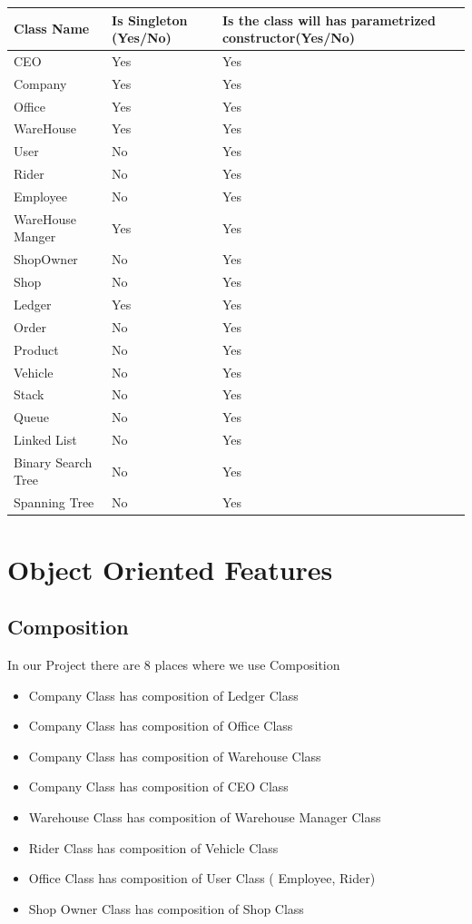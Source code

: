 \documentclass[12pt,a4paper]{report}
\begin{document}
\begin{center}
\begin{tabular}{ | m{4cm}|m{4cm}|m{4cm}|} 
 \hline

\textbf{ Class Name} &\textbf{ Is Singleton (Yes/No)} &\textbf {Is the class will has parametrized constructor(Yes/No)}\\ \hline
CEO 		&Yes	&Yes \\\hline
Company		&Yes	&Yes \\\hline
Office		&Yes	&Yes \\\hline
WareHouse	&Yes		&Yes \\\hline
User		&No		&Yes \\\hline
Rider		&No		&Yes \\\hline
Employee  	&No		&Yes \\\hline
WareHouse Manger  &Yes		&Yes\\ \hline
ShopOwner 	&No		&Yes\\ \hline
Shop	  	&No		&Yes \\ \hline
Ledger	  	&Yes	&Yes \\ \hline
Order		&No		&Yes \\ \hline
Product		&No		&Yes \\ \hline
Vehicle		&No		&Yes \\ \hline
Stack		&No		&Yes \\ \hline
Queue		&No		&Yes \\ \hline
Linked List	&No		&Yes \\ \hline
Binary Search Tree  &No		&Yes\\  \hline
Spanning Tree  &No		&Yes\\  \hline
\end{tabular}
\end{center}
\newpage
\chapter {Object Oriented Features}
\section{Composition}
In our Project there are 8 places where we use Composition
\begin{itemize}
\item   Company Class has composition of Ledger Class
\item  Company Class has composition of Office Class
\item  Company Class has composition of Warehouse Class
\item  Company Class has composition of CEO Class
\item  Warehouse Class has composition of  Warehouse Manager Class
\item  Rider Class has composition of Vehicle Class
\item  Office Class has composition of User Class ( Employee, Rider)
\item  Shop Owner Class has composition of Shop Class
\end{itemize}
\end{document}
